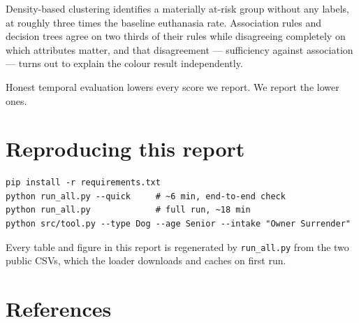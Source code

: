 \documentclass[11pt,a4paper]{article}
\begin{document}
Density-based clustering identifies a materially at-risk group without any
labels, at roughly three times the baseline euthanasia rate. Association rules
and decision trees agree on two thirds of their rules while disagreeing
completely on which attributes matter, and that disagreement --- sufficiency
against association --- turns out to explain the colour result independently.

Honest temporal evaluation lowers every score we report. We report the lower
ones.

\section*{Reproducing this report}

\begin{verbatim}
pip install -r requirements.txt
python run_all.py --quick     # ~6 min, end-to-end check
python run_all.py             # full run, ~18 min
python src/tool.py --type Dog --age Senior --intake "Owner Surrender"
\end{verbatim}

Every table and figure in this report is regenerated by \texttt{run\_all.py}
from the two public CSVs, which the loader downloads and caches on first run.

\section*{References}
\end{document}
